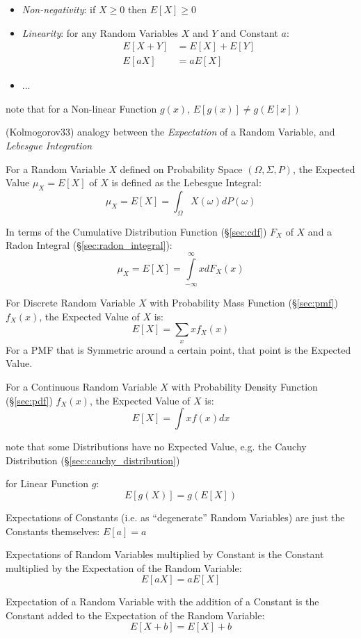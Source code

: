 \begin{itemize}
  \item \emph{Non-negativity}: if $X \geq 0$ then $E[X] \geq 0$
  \item \emph{Linearity}: for any Random Variables $X$ and $Y$ and Constant $a$:
    \begin{align*}
      E[X + Y] & = E[X] + E[Y] \\
      E[aX]    & = a E[X]
    \end{align*}
  \item ...
\end{itemize}

note that for a Non-linear Function $g(x)$, $E[g(x)] \neq g(E[x])$

(Kolmogorov33) analogy between the \emph{Expectation} of a Random Variable, and
\emph{Lebesgue Integration}

For a Random Variable $X$ defined on Probability Space $(\Omega,\Sigma,P)$, the
Expected Value $\mu_X = E[X]$ of $X$ is defined as the Lebesgue Integral:
\[
  \mu_X = E[X] = \int_\Omega X(\omega) dP(\omega)
\]

In terms of the Cumulative Distribution Function (\S\ref{sec:cdf}) $F_X$ of $X$
and a Radon Integral (\S\ref{sec:radon_integral}):
\[
  \mu_X = E[X] = \int\limits_{-\infty}^{\infty} x dF_X(x)
\]

For Discrete Random Variable $X$ with Probability Mass Function
(\S\ref{sec:pmf}) $f_X(x)$, the Expected Value of $X$ is:
\[
  E[X] = \sum_x x f_X(x)
\]
For a PMF that is Symmetric around a certain point, that point is the Expected
Value.

For a Continuous Random Variable $X$ with Probability Density Function
(\S\ref{sec:pdf}) $f_X(x)$, the Expected Value of $X$ is:
\[
  E[X] = \int x f(x) dx
\]

note that some Distributions have no Expected Value, e.g. the Cauchy
Distribution (\S\ref{sec:cauchy_distribution})

for Linear Function $g$:
\[
  E[g(X)] = g(E[X])
\]

Expectations of Constants (i.e. as ``degenerate'' Random Variables) are just
the Constants themselves: $E[a] = a$

Expectations of Random Variables multiplied by Constant is the Constant
multiplied by the Expectation of the Random Variable:
\[
  E[aX] = aE[X]
\]

Expectation of a Random Variable with the addition of a Constant is the
Constant added to the Expectation of the Random Variable:
\[
  E[X + b] = E[X] + b
\]

